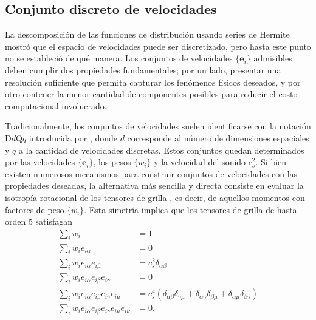 \subsection{Conjunto discreto de velocidades}
La descomposici\'on de las funciones de distribuci\'on usando series de Hermite mostr\'o que el espacio de velocidades puede ser discretizado, pero hasta este punto no se estableci\'o de qu\'e manera. Los conjuntos de velocidades $\{\bm{e}_i\}$ admisibles deben cumplir dos propiedades fundamentales; por un lado, presentar una resoluci\'on suficiente que permita capturar los fen\'omenos f\'isicos deseados, y por otro contener la menor cantidad de componentes posibles para reducir el costo computacional involucrado. 
\par 
Tradicionalmente, los conjuntos de velocidades suelen identificarse con la notaci\'on D$d$Q$q$ introducida por \cite{qian_lattice_1992}, donde $d$ corresponde al n\'umero de dimensiones espaciales y $q$ a la cantidad de velocidades discretas. Estos conjuntos quedan determinados por las velocidades $\{\bm{e}_i\}$, los pesos $\{w_i\}$ y la velocidad del sonido $c_s^2$. Si bien existen numerosos mecanismos para construir conjuntos de velocidades con las propiedades deseadas, la alternativa m\'as sencilla y directa consiste en evaluar la isotrop\'ia rotacional de los tensores de grilla \cite{guo_lattice_2013,frisch_lattice_1987}, es decir, de aquellos momentos con factores de peso $\{w_i\}$. Esta simetr\'ia implica que los tensores de grilla de hasta orden 5 satisfagan
\begin{subequations}
	\begin{align}
	\sum_i w_i &= 1 \\
	\sum_i w_i e_{i\alpha} &= 0 \\
	\sum_i w_i e_{i\alpha} e_{i\beta} &= c_s^2 \delta_{\alpha\beta} \\
	\sum_i w_i e_{i\alpha} e_{i\beta} e_{i\gamma} &= 0 \\
	\sum_i w_i e_{i\alpha} e_{i\beta} e_{i\gamma} e_{i\mu} &= c_s^4(\delta_{\alpha\beta}\delta_{\gamma\mu} + \delta_{\alpha\gamma}\delta_{\beta\mu} + \delta_{\alpha\mu}\delta_{\beta\gamma}) \\
	\sum_i w_i e_{i\alpha} e_{i\beta} e_{i\gamma} e_{i\mu} e_{i\nu} &= 0.
	\end{align}
	\label{eq:tensores_grilla}	
\end{subequations}


